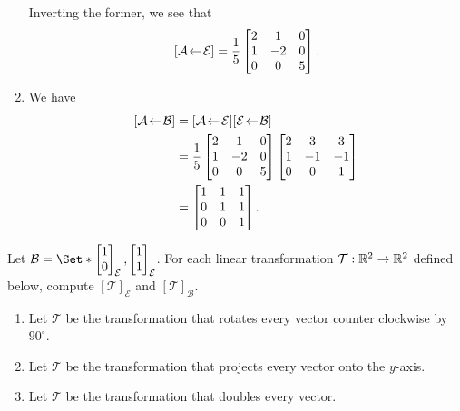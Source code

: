 \begin{exercises}
\begin{problist}
\begin{solution}
\begin{enumerate}
				Inverting the former, we see that
				\[
					\BasisChange{\mathcal E}{\mathcal A}=\frac{1}{5}
					\begin{bmatrix}
						2 & 1 & 0\\
						1 & -2 & 0\\
						0 & 0 & 5
					\end{bmatrix}.
				\]
				\item We have
				\[
					\begin{aligned}
						\BasisChange{\mathcal B}{\mathcal A}
						&=\BasisChange{\mathcal E}{\mathcal A}\BasisChange{\mathcal B}{\mathcal E}\\
						&=\frac{1}{5}
						\begin{bmatrix}
							2 & 1 & 0\\
							1 & -2 & 0\\
							0 & 0 & 5
						\end{bmatrix}
						\begin{bmatrix}
							2 & 3 & 3\\
							1 & -1 & -1\\
							0 & 0 & 1
						\end{bmatrix}\\
						&=
						\begin{bmatrix}
							1 & 1 & 1\\
							0 & 1 & 1\\
							0 & 0 & 1
						\end{bmatrix}.
					\end{aligned}
				\]
			\end{enumerate}
		\end{solution}
		\prob Let $\mathcal B=\Set*{\mat{1\\0}_{\mathcal E},\mat{1\\1}_{\mathcal E}}$.
		For each linear transformation
		$\mathcal T:\R^{2}\to\R^{2}$ defined below, compute
		$[\mathcal T]_{\mathcal E}$ and $[\mathcal T]_{\mathcal B}$.
		\begin{enumerate}
			\item Let $\mathcal T$ be the transformation that rotates
				every vector counter clockwise by $90^{\circ}$.

			\item Let $\mathcal T$ be the transformation that projects
				every vector onto the $y$-axis.
			
			\item Let $\mathcal T$ be the transformation that doubles
				every vector.


\end{enumerate}
\end{problist}
\end{exercises}
